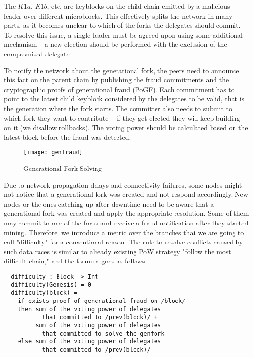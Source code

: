 The $K1a$, $K1b$, etc. are keyblocks on the child chain emitted by a malicious
leader over different microblocks. This
effectively splits the network in many parts, as it becomes unclear to which of
the forks the delegates should commit. To resolve this issue, a single leader
must be agreed upon using some additional mechanism – a new election
should be performed with the exclusion of the compromised delegate.

To notify the network about the generational fork, the peers need to announce
this fact on the parent chain by publishing the fraud commitments and the
cryptographic proofs of generational fraud (PoGF). Each commitment has to point to
the latest child keyblock considered by the delegates to be
valid, that is the generation where the fork starts. The committer also needs
to submit to which fork they want to contribute – if they get elected they
will keep building on it (we disallow rollbacks). The voting power should be
calculated based on the latest block before the fraud was detected.


\begin{figure}[h]
	\caption{Generational Fork Solving}
	\centering
	\texttt{[image: genfraud]}
\end{figure}

Due to network propagation
delays and connectivity failures, some nodes might not notice that a generational
fork was created and not respond accordingly. New nodes or the ones catching up
after downtime need to be aware that a generational fork was created and apply
the appropriate resolution. Some of them may commit to one of the forks and receive a fraud
notification after they started mining. Therefore, we introduce a metric over the
branches that we are going to call "difficulty" for a conventional reason. The
rule to resolve conflicts caused by such data races is similar to already
existing PoW strategy "follow the most difficult chain," and the formula goes
as follows:
\begin{minipage}{\linewidth}
\begin{lstlisting}
  difficulty : Block -> Int
  difficulty(Genesis) = 0
  difficulty(block) =
    if exists proof of generational fraud on /block/
    then sum of the voting power of delegates
           that committed to /prev(block)/ +
         sum of the voting power of delegates
           that committed to solve the genfork
    else sum of the voting power of delegates
           that committed to /prev(block)/
\end{lstlisting}
\end{minipage}

